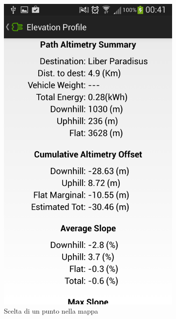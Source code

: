 \begin{figure}
\begin{subfigure}{0.45\textwidth}
	\end{subfigure}
	\begin{subfigure}{0.45\textwidth}
		\includegraphics[width=\textwidth]{assets/mobile-app-altimetry-1.png}
		\caption{Scelta di un punto nella mappa}
		\label{fig:altimetry-1}
	\end{subfigure}
	\begin{subfigure}{0.45\textwidth}

\end{subfigure}
\end{figure}
